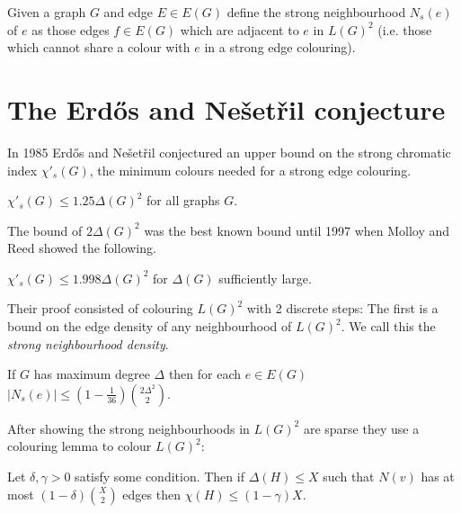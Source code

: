 \begin{definition}
    Given a graph $G$ and edge $E \in E(G)$ define the strong neighbourhood
    $N_s(e)$ of $e$ as those edges $f \in E(G)$ which are adjacent to $e$ in 
    $L(G)^2$ (i.e. those which cannot share a colour with $e$ in a strong edge colouring).
\end{definition}

\section{The Erd\H{o}s and Nešetřil conjecture}

In 1985 Erd\H{o}s and Nešetřil \cite{faudreeInducedMatchingsBipartite1989} conjectured an
upper bound on the strong chromatic index $\chi'_s(G)$, the minimum colours needed for
a strong edge colouring.

\begin{conjecture}
    $\chi'_s(G) \leq 1.25\Delta(G)^2$ for all graphs $G$.
\end{conjecture}

The bound of $2\Delta(G)^2$ was the best known bound until 1997 when Molloy and Reed
showed the following.
\begin{knowntheorem}
    $\chi'_s(G) \leq 1.998\Delta(G)^2$ for $\Delta(G)$ sufficiently large.
\end{knowntheorem}

Their proof consisted of colouring $L(G)^2$ with 2 discrete steps:
The first is a bound on the edge density of any neighbourhood of $L(G)^2$. We call
this the \textit{strong neighbourhood density}.
\begin{knownlemma}
    If $G$ has maximum degree $\Delta$ then for each $e\in E(G)$
    $|N_s(e)| \leq (1-\frac{1}{36})\binom{2\Delta^2}{2}$.
\end{knownlemma}
After showing the strong neighbourhoods in $L(G)^2$ are sparse they use a colouring
lemma to colour $L(G)^2$:
\begin{knownlemma}
    Let $\delta, \gamma > 0$ satisfy some condition. Then if
    $\Delta(H) \leq X$ such that $N(v)$ has at most $(1-\delta)\binom{X}{2}$ edges
    then $\chi(H)\leq (1-\gamma)X$.
\end{knownlemma}

